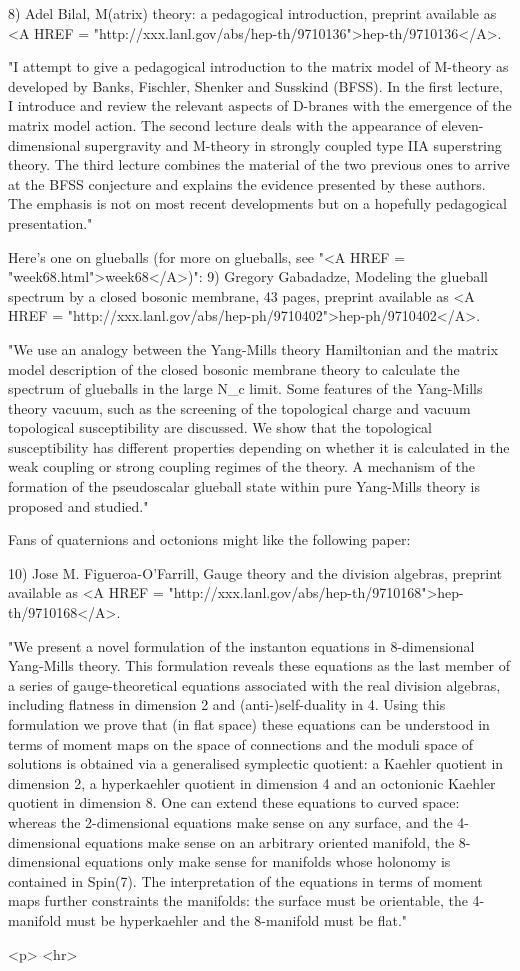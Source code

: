 8) Adel Bilal, M(atrix) theory: a pedagogical introduction, 
preprint available as <A HREF = "http://xxx.lanl.gov/abs/hep-th/9710136">hep-th/9710136</A>.

"I attempt to give a pedagogical introduction to the matrix model of
M-theory as developed by Banks, Fischler, Shenker and Susskind
(BFSS). In the first lecture, I introduce and review the relevant
aspects of D-branes with the emergence of the matrix model action. The
second lecture deals with the appearance of eleven-dimensional
supergravity and M-theory in strongly coupled type IIA superstring
theory. The third lecture combines the material of the two previous ones
to arrive at the BFSS conjecture and explains the evidence presented by
these authors. The emphasis is not on most recent developments but on a
hopefully pedagogical presentation."

Here's one on glueballs (for more on glueballs, see "<A HREF =
"week68.html">week68</A>)": 
9) Gregory Gabadadze, Modeling the glueball spectrum by a closed bosonic
membrane, 43 pages, preprint available as
<A HREF = "http://xxx.lanl.gov/abs/hep-ph/9710402">hep-ph/9710402</A>.

"We use an analogy between the Yang-Mills theory Hamiltonian and the
matrix model description of the closed bosonic membrane theory to
calculate the spectrum of glueballs in the large N_c limit. Some
features of the Yang-Mills theory vacuum, such as the screening of the
topological charge and vacuum topological susceptibility are
discussed. We show that the topological susceptibility has different
properties depending on whether it is calculated in the weak coupling or
strong coupling regimes of the theory. A mechanism of the formation of
the pseudoscalar glueball state within pure Yang-Mills theory is
proposed and studied."

Fans of quaternions and octonions might like the following paper:

10) Jose M. Figueroa-O'Farrill, Gauge theory and the division algebras, 
preprint available as <A HREF = "http://xxx.lanl.gov/abs/hep-th/9710168">hep-th/9710168</A>.  

"We present a novel formulation of the instanton equations in
8-dimensional Yang-Mills theory. This formulation reveals these
equations as the last member of a series of gauge-theoretical equations
associated with the real division algebras, including flatness in
dimension 2 and (anti-)self-duality in 4. Using this formulation we
prove that (in flat space) these equations can be understood in terms of
moment maps on the space of connections and the moduli space of
solutions is obtained via a generalised symplectic quotient: a Kaehler
quotient in dimension 2, a hyperkaehler quotient in dimension 4 and an
octonionic Kaehler quotient in dimension 8. One can extend these
equations to curved space: whereas the 2-dimensional equations make
sense on any surface, and the 4-dimensional equations make sense on an
arbitrary oriented manifold, the 8-dimensional equations only make sense
for manifolds whose holonomy is contained in Spin(7). The interpretation
of the equations in terms of moment maps further constraints the
manifolds: the surface must be orientable, the 4-manifold must be
hyperkaehler and the 8-manifold must be flat."

<p> <hr>



